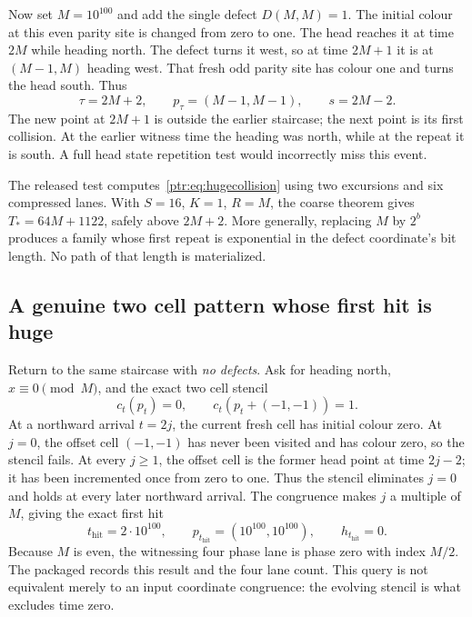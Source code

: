 \documentclass[11pt,letterpaper]{article}
\theoremstyle{definition}\newtheorem{definition}[theorem]{Definition}
\theoremstyle{remark}\newtheorem{remark}[theorem]{Remark}
\newcommand{\code}[1]{\texttt{\detokenize{#1}}}
\begin{document}
Now set $M=10^{100}$ and add the single defect $D(M,M)=1$. The initial colour at this even parity site is changed from zero to one. The head reaches it at time $2M$ while heading north. The defect turns it west, so at time $2M+1$ it is at $(M-1,M)$ heading west. That fresh odd parity site has colour one and turns the head south. Thus
\begin{equation}\label{ptr:eq:hugecollision}
 \tau=2M+2,\qquad p_\tau=(M-1,M-1),\qquad s=2M-2.
\end{equation}
The new point at $2M+1$ is outside the earlier staircase; the next point is its first collision. At the earlier witness time the heading was north, while at the repeat it is south. A full head state repetition test would incorrectly miss this event.

The released test computes~\eqref{ptr:eq:hugecollision} using two excursions and six compressed lanes. With $S=16$, $K=1$, $R=M$, the coarse theorem gives $T_*=64M+1122$, safely above $2M+2$. More generally, replacing $M$ by $2^b$ produces a family whose first repeat is exponential in the defect coordinate's bit length. No path of that length is materialized.

\subsection{A genuine two cell pattern whose first hit is huge}
Return to the same staircase with \emph{no defects}. Ask for heading north, $x\equiv0\pmod M$, and the exact two cell stencil
\begin{equation}\label{ptr:eq:examplequery}
 c_t(p_t)=0,\qquad c_t(p_t+(-1,-1))=1.
\end{equation}
At a northward arrival $t=2j$, the current fresh cell has initial colour zero. At $j=0$, the offset cell $(-1,-1)$ has never been visited and has colour zero, so the stencil fails. At every $j\ge1$, the offset cell is the former head point at time $2j-2$; it has been incremented once from zero to one. Thus the stencil eliminates $j=0$ and holds at every later northward arrival. The congruence makes $j$ a multiple of $M$, giving the exact first hit
\begin{equation}\label{ptr:eq:hugehit}
 t_{\mathrm{hit}}=2\cdot10^{100},\qquad
 p_{t_{\mathrm{hit}}}=(10^{100},10^{100}),\qquad h_{t_{\mathrm{hit}}}=0.
\end{equation}
Because $M$ is even, the witnessing four phase lane is phase zero with index $M/2$. The packaged \code{example-result.json} records this result and the four lane count. This query is not equivalent merely to an input coordinate congruence: the evolving stencil is what excludes time zero.
\end{document}
